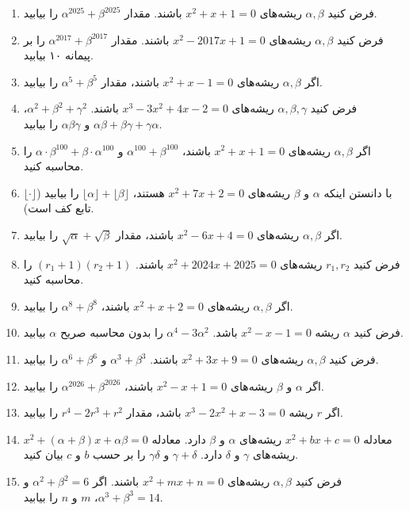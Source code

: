 \documentclass[12pt,a4paper]{article}
\begin{document}
\setcounter{enumi}{130}
\begin{enumerate}
\item فرض کنید $\alpha, \beta$ ریشه‌های $x^2 + x + 1 = 0$ باشند. مقدار $\alpha^{2025} + \beta^{2025}$ را بیابید.
\item فرض کنید $\alpha, \beta$ ریشه‌های $x^2 - 2017x + 1 = 0$ باشند. مقدار $\alpha^{2017} + \beta^{2017}$ را بر پیمانه ۱۰ بیابید.
\item اگر $\alpha, \beta$ ریشه‌های $x^2 + x - 1 = 0$ باشند، مقدار $\alpha^5 + \beta^5$ را بیابید.
\item فرض کنید $\alpha, \beta, \gamma$ ریشه‌های $x^3 - 3x^2 + 4x - 2 = 0$ باشند. $\alpha^2 + \beta^2 + \gamma^2$، $\alpha\beta + \beta\gamma + \gamma\alpha$ و $\alpha\beta\gamma$ را بیابید.
\item اگر $\alpha, \beta$ ریشه‌های $x^2 + x + 1 = 0$ باشند، $\alpha^{100} + \beta^{100}$ و $\alpha \cdot \beta^{100} + \beta \cdot \alpha^{100}$ را محاسبه کنید.
\item با دانستن اینکه $\alpha$ و $\beta$ ریشه‌های $x^2 + 7x + 2 = 0$ هستند، $\lfloor \alpha \rfloor + \lfloor \beta \rfloor$ را بیابید ($\lfloor \cdot \rfloor$ تابع کف است).
\item اگر $\alpha, \beta$ ریشه‌های $x^2 - 6x + 4 = 0$ باشند، مقدار $\sqrt{\alpha} + \sqrt{\beta}$ را بیابید.
\item فرض کنید $r_1, r_2$ ریشه‌های $x^2 + 2024x + 2025 = 0$ باشند. $(r_1 + 1)(r_2 + 1)$ را محاسبه کنید.
\item اگر $\alpha, \beta$ ریشه‌های $x^2 + x + 2 = 0$ باشند، $\alpha^8 + \beta^8$ را بیابید.
\item فرض کنید $\alpha$ ریشه $x^2 - x - 1 = 0$ باشد. $\alpha^4 - 3\alpha^2$ را بدون محاسبه صریح $\alpha$ بیابید.
\item فرض کنید $\alpha, \beta$ ریشه‌های $x^2 + 3x + 9 = 0$ باشند. $\alpha^3 + \beta^3$ و $\alpha^6 + \beta^6$ را بیابید.
\item اگر $\alpha$ و $\beta$ ریشه‌های $x^2 - x + 1 = 0$ باشند، $\alpha^{2026} + \beta^{2026}$ را بیابید.
\item اگر $r$ ریشه $x^3 - 2x^2 + x - 3 = 0$ باشد، مقدار $r^4 - 2r^3 + r^2$ را بیابید.
\item معادله $x^2 + bx + c = 0$ ریشه‌های $\alpha$ و $\beta$ دارد. معادله $x^2 + (\alpha + \beta)x + \alpha\beta = 0$ ریشه‌های $\gamma$ و $\delta$ دارد. $\gamma + \delta$ و $\gamma\delta$ را بر حسب $b$ و $c$ بیان کنید.
\item فرض کنید $\alpha, \beta$ ریشه‌های $x^2 + mx + n = 0$ باشند. اگر $\alpha^2 + \beta^2 = 6$ و $\alpha^3 + \beta^3 = 14$، $m$ و $n$ را بیابید.

\end{enumerate}
\end{document}
